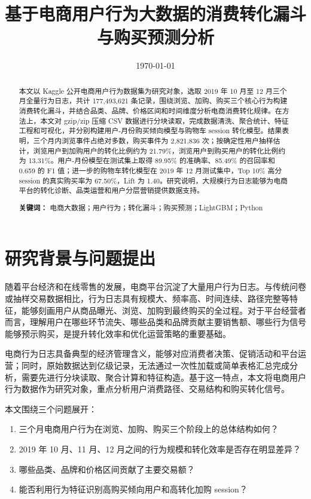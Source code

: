 \documentclass[12pt,hyperref,a4paper,UTF8]{ctexart}
\title{基于电商用户行为大数据的消费转化漏斗与购买预测分析}
\author{}
\date{\today}
\begin{document}
\cover
{}

\begin{abstract}
本文以 Kaggle 公开电商用户行为数据集为研究对象，选取 2019 年 10 月至 12 月三个月全量行为日志，共计 177,493,621 条记录，围绕浏览、加购、购买三个核心行为构建消费转化漏斗，并结合品类、品牌、价格区间和时间维度分析电商消费转化规律。在方法上，本文对 gzip/zip 压缩 CSV 数据进行分块读取，完成数据清洗、聚合统计、特征工程和可视化，并分别构建用户-月份购买倾向模型与购物车 session 转化模型。结果表明，三个月内浏览事件占绝对多数，购买事件为 2,821,836 次；按确定性用户抽样估计，浏览用户到加购用户的转化比例约为 21.79\%，浏览用户到购买用户的转化比例约为 13.31\%。用户-月份模型在测试集上取得 89.95\% 的准确率、85.49\% 的召回率和 0.659 的 F1 值；进一步的购物车转化模型在 2019 年 12 月测试集中，Top 10\% 高分 session 的真实购买率为 67.50\%，Lift 为 1.40。研究说明，大规模行为日志能够为电商平台的转化诊断、品类运营和用户分层营销提供数据支持。

\textbf{关键词：} 电商大数据；用户行为；转化漏斗；购买预测；LightGBM；Python
\end{abstract}

\thispagestyle{empty}

\newpage
\tableofcontents
\newpage

\section{研究背景与问题提出}

随着平台经济和在线零售的发展，电商平台沉淀了大量用户行为日志。与传统问卷或抽样交易数据相比，行为日志具有规模大、频率高、时间连续、路径完整等特征，能够刻画用户从商品曝光、浏览、加购到最终购买的全过程。对于平台经营者而言，理解用户在哪些环节流失、哪些品类和品牌贡献主要销售额、哪些行为信号能够预示购买，是提升转化效率和优化运营策略的重要基础。

电商行为日志具备典型的经济管理含义，能够对应消费者决策、促销活动和平台运营；同时，原始数据达到亿级记录，无法通过一次性加载或简单表格汇总完成分析，需要先进行分块读取、聚合计算和特征构造。基于这一特点，本文将电商用户行为数据作为研究对象，重点分析用户消费路径、交易结构和购买转化信号。

本文围绕三个问题展开：
\begin{enumerate}
  \item 三个月电商用户行为在浏览、加购、购买三个阶段上的总体结构如何？
  \item 2019 年 10 月、11 月、12 月之间的行为规模和转化效率是否存在明显差异？
  \item 哪些品类、品牌和价格区间贡献了主要交易额？
  \item 能否利用行为特征识别高购买倾向用户和高转化加购 session？
\end{enumerate}
\end{document}
